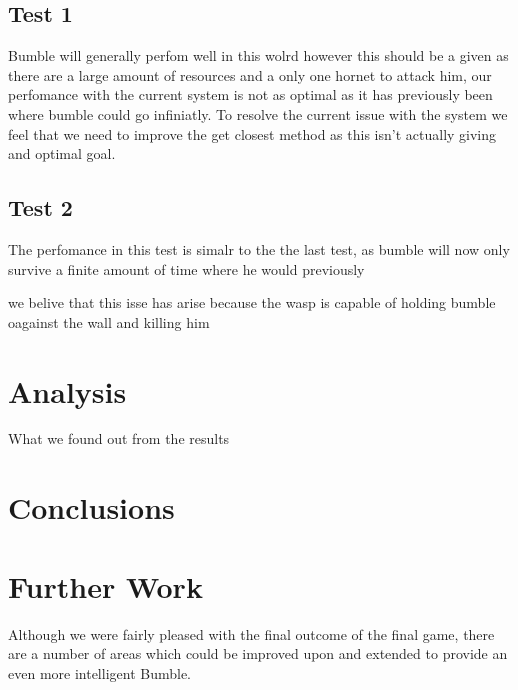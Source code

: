 \documentclass[a4paper,oneside]{report}
\begin{document}
	
	\subsection{Test 1}
		Bumble will generally perfom well in this wolrd however this should be a given as there are a large amount of resources and a only one hornet to attack him, our perfomance with the current system is not as optimal as it has previously been where bumble could go infiniatly. To resolve the current issue with the system we feel that we need to improve the get closest method as this isn't actually giving and optimal goal. 
		
	\subsection{Test 2}
		The perfomance in this test is simalr to the the last test,  as bumble will now only survive a finite amount of time where he would previously 
		
		
		we belive that this isse has arise because the wasp is capable of holding bumble oagainst the wall and killing him
	
	
	

\section{Analysis}

What we found out from the results

\section{Conclusions}

\section{Further Work}

Although we were fairly pleased with the final outcome of the final game, there are a number of areas which could be improved upon and extended to provide an even more intelligent Bumble.
	
\end{document}
